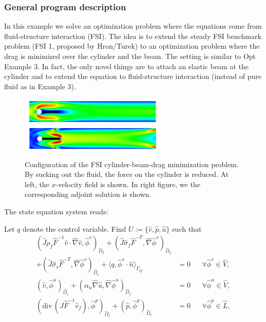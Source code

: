 \subsubsection{General program description}
In this example we solve an optimization problem where 
the equations come from fluid-structure interaction (FSI). The idea
is to extend the steady FSI benchmark problem (FSI 1, proposed by Hron/Turek) 
to an optimization 
problem where the drag is minimized over the cylinder and the beam. 
The setting is similar to Opt Example 3. In fact, the only 
novel things are to attach an elastic beam at the cylinder and to 
extend the equation to fluid-structure interaction (instead of 
pure fluid as in Example 3).

\begin{figure}[h]
\centering
    {\includegraphics[width=7cm]{Documentation/visit_fsi_1_opt_control_p3_0002_bearbeitet_Aug_15.png}}
    {\includegraphics[width=7cm]{Documentation/visit_fsi_1_opt_control_p3_0005_bearbeitet_Aug_15.png}}
  \caption{Configuration of the FSI cylinder-beam-drag minimization problem. 
By sucking out the fluid, 
the force on the cylinder is reduced. At left, the $x$-velocity field 
is shown. In right figure, we the corresponding adjoint solution is shown.}
\end{figure}

The state equation system reads:
\begin{Problem}
Let $q$ denote the control variable. Find $U:= \{\hat v,\hat p,\hat u\}$ such that
  \begin{equation*}
    \begin{aligned}
      (\hat J \rho_f \hat F^{-1}\hat  v\cdot\hat\nabla \hat v,
      \hat\phi^v)_{\hat\Omega_f}
      + (\hat J\hat\sigma_f\hat F^{-T},\hat \nabla\hat\phi^v)_{\hat\Omega_f}\\
      + (\hat J\hat\sigma_s\hat F^{-T},\hat \nabla\hat\phi^v)_{\hat\Omega_s}
      + \langle q,\hat\phi^v\cdot \hat n\rangle_{\Gamma_Q}
      &= 0&&\forall\hat\phi^v\in \hat V,\\
      (\hat v,\hat\phi^u)_{\hat\Omega_s}
      + (\alpha_u \hat \nabla \hat u,\hat \nabla\hat\phi^u)_{\hat\Omega_f}
      &=0&&\forall\hat\phi^u\in \hat V,\\
      (\widehat{\text{div}}\,(\hat J\hat F^{-1}\hat
      v_f),\hat\phi^p)_{\hat\Omega_f} 
      + (\hat p,\hat \phi^p)_{\hat\Omega_s}
      &=0&&\forall\hat \phi^p\in \hat L,
    \end{aligned}
  \end{equation*}  
\end{Problem}

